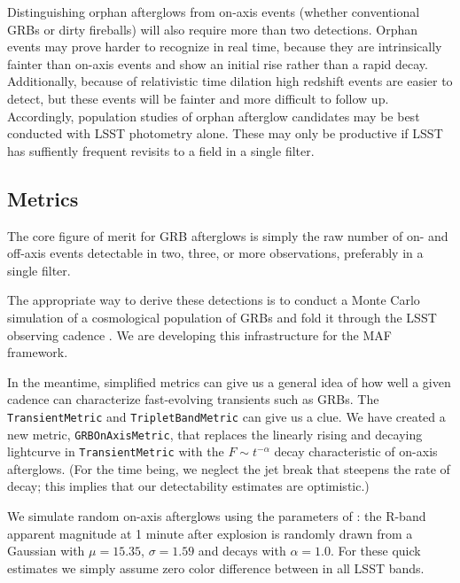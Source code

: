 Distinguishing orphan afterglows from on-axis events (whether conventional GRBs or dirty fireballs) will also require more than two detections.  Orphan events may prove harder to recognize in real time, because they are intrinsically fainter than on-axis events and show an initial rise rather than a rapid decay.  
Additionally, because of relativistic time dilation high redshift events are easier to detect, but these events will be fainter and more difficult to follow up.
Accordingly, population studies of orphan afterglow candidates may be best conducted with LSST photometry alone.  These may only be productive if LSST has suffiently frequent revisits to a field in a single filter.


\subsection{Metrics}
\label{sec:keyword:metrics}

The core figure of merit for GRB afterglows is simply the raw number of on- and off-axis events detectable in two, three, or more observations, preferably in a single filter.

The appropriate way to derive these detections is to conduct a Monte Carlo simulation of a cosmological population of GRBs and fold it through the LSST observing cadence \citep[cf.][]{2011PASP..123.1034J}.  We are developing this infrastructure for the MAF framework.  

In the meantime, simplified metrics can give us a general idea of how well a given cadence can characterize fast-evolving transients such as GRBs.
The \texttt{TransientMetric} and \texttt{TripletBandMetric} 
can give us a clue.  We have created a new metric, \texttt{GRBOnAxisMetric}, that replaces the linearly rising and decaying lightcurve in 
\texttt{TransientMetric} with the $F \sim t^{-\alpha}$ decay characteristic of on-axis afterglows.  (For the time being, we neglect the jet break that steepens the rate of decay; this implies that our detectability estimates are optimistic.)

We simulate random on-axis afterglows using the parameters of \citet{2011PASP..123.1034J}: the R-band apparent magnitude at 1 minute after explosion is randomly drawn from a Gaussian with $\mu=15.35$, $\sigma=1.59$ and decays with $\alpha=1.0$.  For these quick estimates we simply assume zero color difference between in all LSST bands.

